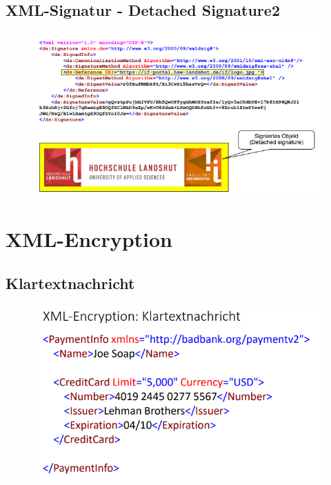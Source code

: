 \subsection{XML-Signatur - Detached Signature2}
\begin{figure}[H]
	\begin{center}
		\includegraphics[scale=0.8]{Resources/DetachedSignature2}
		\caption{}
		\label{fig:DetachedSignature2}
	\end{center}
\end{figure}

\section{XML-Encryption}
\subsection{Klartextnachricht}
\begin{figure}[H]
	\begin{center}
		\includegraphics[scale=0.8]{Resources/XMLEncrypt1}
		\caption{}
		\label{fig:XMLEncrypt1}
	\end{center}
\end{figure}

